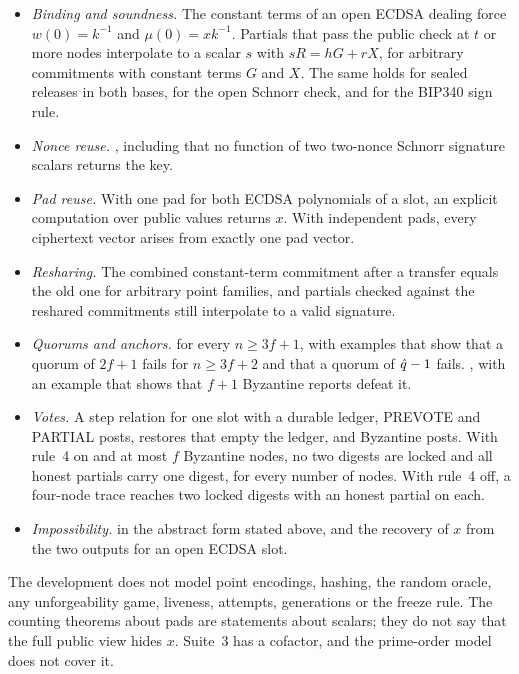\begin{itemize}[leftmargin=1.5em,itemsep=1pt]
\item \emph{Binding and soundness.} The constant terms of an open ECDSA dealing force $w(0) = k^{-1}$ and $\mu(0) = xk^{-1}$. Partials that pass the public check at $t$ or more nodes interpolate to a scalar $s$ with $sR = hG + rX$, for arbitrary commitments with constant terms $G$ and $X$. The same holds for sealed releases in both bases, for the open Schnorr check, and for the BIP340 sign rule.
\item \emph{Nonce reuse.} , including that no function of two two-nonce Schnorr signature scalars returns the key.
\item \emph{Pad reuse.} With one pad for both ECDSA polynomials of a slot, an explicit computation over public values returns $x$. With independent pads, every ciphertext vector arises from exactly one pad vector.
\item \emph{Resharing.} The combined constant-term commitment after a transfer equals the old one for arbitrary point families, and partials checked against the reshared commitments still interpolate to a valid signature.
\item \emph{Quorums and anchors.}  for every $n \ge 3f+1$, with examples that show that a quorum of $2f+1$ fails for $n \ge 3f+2$ and that a quorum of $\hat{q} - 1$ fails. , with an example that shows that $f+1$ Byzantine reports defeat it.
\item \emph{Votes.} A step relation for one slot with a durable ledger, PREVOTE and PARTIAL posts, restores that empty the ledger, and Byzantine posts. With rule~4 on and at most $f$ Byzantine nodes, no two digests are locked and all honest partials carry one digest, for every number of nodes. With rule~4 off, a four-node trace reaches two locked digests with an honest partial on each.
\item \emph{Impossibility.}  in the abstract form stated above, and the recovery of $x$ from the two outputs for an open ECDSA slot.
\end{itemize}

The development does not model point encodings, hashing, the random oracle, any unforgeability game, liveness, attempts, generations or the freeze rule. The counting theorems about pads are statements about scalars; they do not say that the full public view hides $x$. Suite~3 has a cofactor, and the prime-order model does not cover it.

